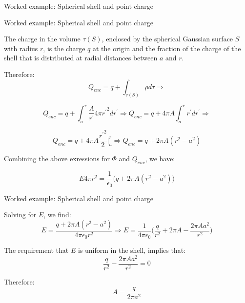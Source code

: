 {\begin{frame}{Worked example: Spherical shell and point charge}
\end{frame}

%
%
%

\begin{frame}{Worked example: Spherical shell and point charge}

  The charge in the volume $\tau(S)$,
  enclosed by the spherical Gaussian surface $S$ with radius $r$,
  is the charge $q$ at the origin and the fraction of the charge of the shell
  that is distributed at radial distances between $a$ and $r$.

  Therefore:
  \begin{equation*}
  	 Q_{enc} = q + \int_{\tau(S)}{\rho d\tau} \Rightarrow
  \end{equation*}

  \begin{equation*}
  	 Q_{enc} = q + \int_{a}^{r} \frac{A}{r^{\prime}} 4\pi {r^{\prime}}^{2} dr^{\prime} \Rightarrow
  	 Q_{enc} = q + 4\pi A \int_{a}^{r} r^{\prime} dr^{\prime} \Rightarrow
  \end{equation*}

  \begin{equation*}
  	 Q_{enc} = q + 4\pi A \frac{{r^{\prime}}^2}{2}\Big\rvert_{a}^{r} \Rightarrow
  	 Q_{enc} = q + 2\pi A (r^2 - a^2)
  \end{equation*}

  Combining the above exressions for $\Phi$ and $Q_{enc}$, we have:

  \begin{equation*}
  	 E 4\pi r^2 = \frac{1}{\epsilon_0} \Big( q + 2\pi A (r^2 - a^2) \Big)
  \end{equation*}

\end{frame}

%
%
%

\begin{frame}{Worked example: Spherical shell and point charge}

  Solving for $E$, we find:
  \begin{equation*}
  	 E = \frac{q + 2\pi A (r^2 - a^2)}{4\pi \epsilon_0 r^2} \Rightarrow
  	 E = \frac{1}{4\pi \epsilon_0 }
      \Big( \frac{q}{r^2} + 2\pi A - \frac{2\pi A a^2}{r^2} \Big)
  \end{equation*}

  The requirement that $E$ is uniform in the shell, implies that:
  \begin{equation*}
      \frac{q}{r^2} - \frac{2\pi A a^2}{r^2} = 0
  \end{equation*}

  Therefore:
  \begin{equation*}
      A = \frac{q}{2\pi a^2}
  \end{equation*}

\end{frame}

} %

